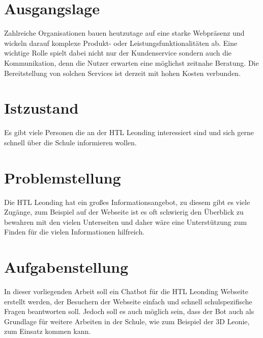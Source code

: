 \section{Ausgangslage}
Zahlreiche Organisationen bauen heutzutage auf eine starke Webpräsenz und wickeln darauf komplexe Produkt- oder Leistungsfunktionalitäten ab. Eine wichtige Rolle spielt dabei nicht nur der Kundenservice sondern auch die Kommunikation, denn die Nutzer erwarten eine möglichst zeitnahe Beratung. Die Bereitstellung von solchen Services ist derzeit mit hohen Kosten verbunden.

\section{Istzustand}
Es gibt viele Personen die an der HTL Leonding interessiert sind und sich gerne schnell über die Schule informieren wollen.


\section{Problemstellung}
Die HTL Leonding hat ein großes Informationsangebot, zu diesem gibt es viele Zugänge, zum Beispiel auf der Webseite ist es oft schwierig den Überblick zu bewahren mit den vielen Unterseiten und daher wäre eine Unterstützung zum Finden für die vielen Informationen hilfreich.

\section{Aufgabenstellung}
In dieser vorliegenden Arbeit soll ein Chatbot für die HTL Leonding Webseite erstellt werden, der Besuchern der Webseite einfach und schnell schulspezifische Fragen beantworten soll.
Jedoch soll es auch möglich sein, dass der Bot auch als Grundlage für weitere Arbeiten in der Schule, wie zum Beispiel der 3D Leonie, zum Einsatz kommen kann.

